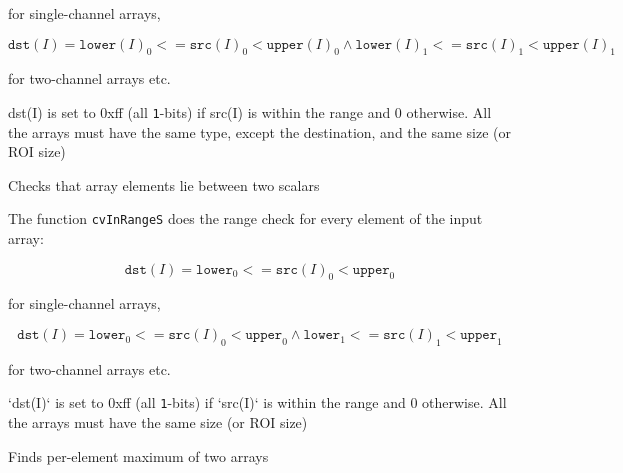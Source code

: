 for single-channel arrays,

\[
\texttt{dst}(I)=
\texttt{lower}(I)_0 <= \texttt{src}(I)_0 < \texttt{upper}(I)_0 \land
\texttt{lower}(I)_1 <= \texttt{src}(I)_1 < \texttt{upper}(I)_1
\]

for two-channel arrays etc.

dst(I) is set to 0xff (all \texttt{1}-bits) if src(I) is within the range and 0 otherwise. All the arrays must have the same type, except the destination, and the same size (or ROI size)


\label{InRangeS}

Checks that array elements lie between two scalars


\begin{description}
\end{description}


The function \texttt{cvInRangeS} does the range check for every element of the input array:

\[
\texttt{dst}(I)=\texttt{lower}_0 <= \texttt{src}(I)_0 < \texttt{upper}_0
\]

for single-channel arrays,

\[
\texttt{dst}(I)=
\texttt{lower}_0 <= \texttt{src}(I)_0 < \texttt{upper}_0 \land
\texttt{lower}_1 <= \texttt{src}(I)_1 < \texttt{upper}_1
\]

for two-channel arrays etc.

`dst(I)` is set to 0xff (all \texttt{1}-bits) if `src(I)` is within the range and 0 otherwise. All the arrays must have the same size (or ROI size)

\label{Max}

Finds per-element maximum of two arrays


\begin{description}
\end{description}

